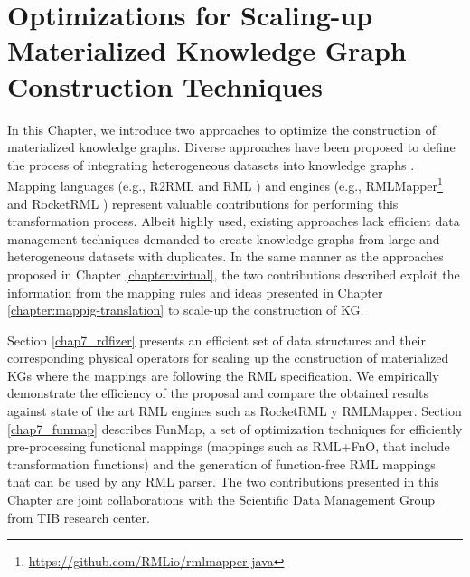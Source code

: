 
\chapter{Optimizations for Scaling-up Materialized Knowledge Graph Construction Techniques}
\label{chapter:construction}


In this Chapter, we introduce two approaches to optimize the construction of materialized knowledge graphs. Diverse approaches have been proposed to define the process of integrating heterogeneous datasets into knowledge graphs \citep{chebotko2009semantics,calvanese2017ontop,chaves2019what,priyatna2014formalisation}. Mapping languages (e.g., R2RML \citep{R2RML} and RML \citep{dimou2014rml}) and engines (e.g., RMLMapper\footnote{\url{https://github.com/RMLio/rmlmapper-java}} and RocketRML \citep{csimcsek2019rocketrml}) represent valuable contributions for performing this transformation process. Albeit highly used, existing approaches lack efficient data management techniques demanded to create knowledge graphs from large and heterogeneous datasets with duplicates. In the same manner as the approaches proposed in Chapter \ref{chapter:virtual}, the two contributions described exploit the information from the mapping rules and ideas presented in Chapter \ref{chapter:mappig-translation} to scale-up the construction of KG.

Section \ref{chap7_rdfizer} presents an efficient set of data structures and their corresponding physical operators for scaling up the construction of materialized KGs where the mappings are following the RML specification. We empirically demonstrate the efficiency of the proposal and compare the obtained results against state of the art RML engines such as RocketRML y RMLMapper. Section \ref{chap7_funmap} describes FunMap, a set of optimization techniques for efficiently pre-processing functional mappings (mappings such as RML+FnO, that include transformation functions) and the generation of function-free RML mappings that can be used by any RML parser. The two contributions presented in this Chapter are joint collaborations with the Scientific Data Management Group from TIB research center.







